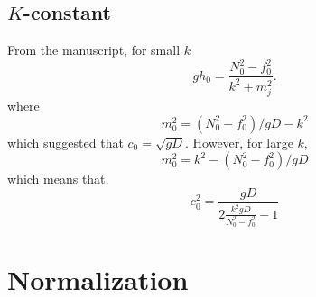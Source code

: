 \documentclass[11pt]{article}
\begin{document}
\subsection{$K$-constant}

From the manuscript, for small $k$
\[
g h_0 = \frac{N_0^2 - f_0^2}{k^2+m_j^2}.
\]
where
\[
m_0^2 = (N_0^2-f_0^2)/gD - k^2
\]
which suggested that $c_0 = \sqrt{gD}$. However, for large $k$,
\[
m_0^2 = k^2 - (N_0^2-f_0^2)/gD
\]
which means that,
\[
c_0^2 = \frac{gD}{ 2\frac{k^2 g D}{N_0^2 - f_0^2} - 1}
\]



%
\section{Normalization}
%
\end{document}

